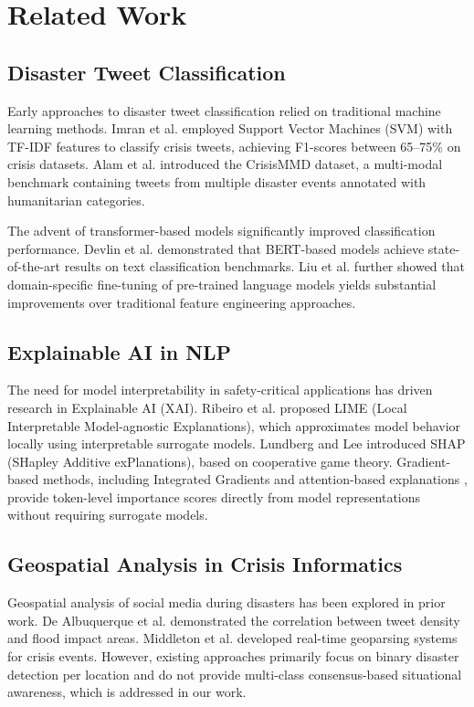 \documentclass[pdflatex,sn-mathphys-num]{sn-jnl}%
\theoremstyle{thmstyleone}%
\theoremstyle{thmstyletwo}%
\theoremstyle{thmstylethree}%
\begin{document}
\section{Related Work}

\subsection{Disaster Tweet Classification}

Early approaches to disaster tweet classification relied on traditional machine learning methods. Imran et al. \cite{ref4} employed Support Vector Machines (SVM) with TF-IDF features to classify crisis tweets, achieving F1-scores between 65--75\% on crisis datasets. Alam et al. \cite{ref5} introduced the CrisisMMD dataset, a multi-modal benchmark containing tweets from multiple disaster events annotated with humanitarian categories.

The advent of transformer-based models significantly improved classification performance. Devlin et al. \cite{ref6} demonstrated that BERT-based models achieve state-of-the-art results on text classification benchmarks. Liu et al. \cite{ref7} further showed that domain-specific fine-tuning of pre-trained language models yields substantial improvements over traditional feature engineering approaches.

\subsection{Explainable AI in NLP}

The need for model interpretability in safety-critical applications has driven research in Explainable AI (XAI). Ribeiro et al. \cite{ref8} proposed LIME (Local Interpretable Model-agnostic Explanations), which approximates model behavior locally using interpretable surrogate models. Lundberg and Lee \cite{ref9} introduced SHAP (SHapley Additive exPlanations), based on cooperative game theory. Gradient-based methods, including Integrated Gradients \cite{ref10} and attention-based explanations \cite{ref11}, provide token-level importance scores directly from model representations without requiring surrogate models.

\subsection{Geospatial Analysis in Crisis Informatics}

Geospatial analysis of social media during disasters has been explored in prior work. De Albuquerque et al. \cite{ref12} demonstrated the correlation between tweet density and flood impact areas. Middleton et al. \cite{ref13} developed real-time geoparsing systems for crisis events. However, existing approaches primarily focus on binary disaster detection per location and do not provide multi-class consensus-based situational awareness, which is addressed in our work.
\end{document}
